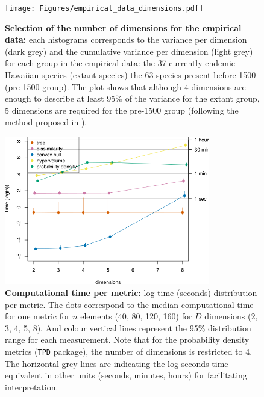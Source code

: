 \documentclass[12pt,letterpaper]{article}
\begin{document}
\begin{figure}[!htbp]
\centering
   \texttt{[image: Figures/empirical\_data\_dimensions.pdf]}
\caption{\scriptsize{\textbf{Selection of the number of dimensions for the empirical data:} each histograms corresponds to the variance per dimension (dark grey) and the cumulative variance per dimension (light grey) for each group in the empirical data: the 37 currently endemic Hawaiian species (extant species) the 63 species present before 1500 (pre-1500 group). The plot shows that although 4 dimensions are enough to describe at least 95\% of the variance for the extant group, 5 dimensions are required for the pre-1500 group (following the method proposed in \cite{guillerme2023innovation}).
}}
\label{Fig:empirical_dimensions}
\end{figure}
\bigskip










\begin{figure}[!htbp]
\centering
   \includegraphics[width=0.8\textwidth]{Figures/time_per_metric}
\caption{\scriptsize{\textbf{Computational time per metric:} log time (seconds) distribution per metric. The dots correspond to the median computational time for one metric for $n$ elements (40, 80, 120, 160) for $D$ dimensions (2, 3, 4, 5, 8). And colour vertical lines represent the 95\% distribution range for each measurement. Note that for the probability density metrics (\texttt{TPD} package), the number of dimensions is restricted to 4. The horizontal grey lines are indicating the log seconds time equivalent in other units (seconds, minutes, hours) for facilitating interpretation.
}}
\label{Fig:metrics_time}
\end{figure}
\bigskip
\end{document}

